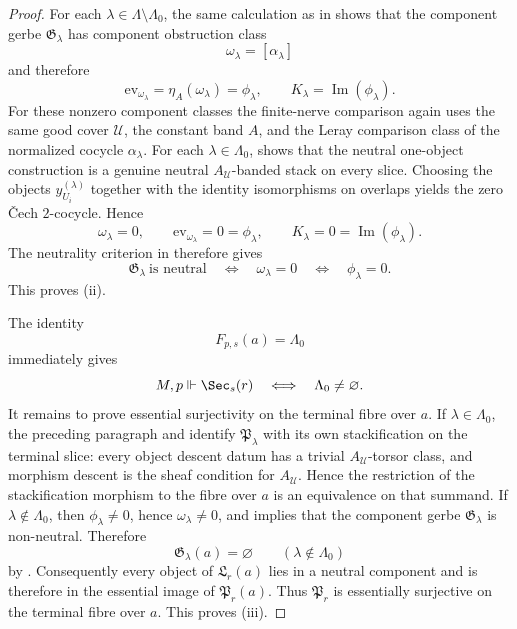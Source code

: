 \begin{proof}
For each $\lambda\in\Lambda\setminus\Lambda_0$, the same calculation as in  shows that the component gerbe $\mathfrak G_\lambda$ has component obstruction class
\[
\omega_\lambda=[\alpha_\lambda]
\]
and therefore
\[
\mathrm{ev}_{\omega_\lambda}=\eta_A(\omega_\lambda)=\phi_\lambda,
\qquad
K_\lambda=\operatorname{Im}(\phi_\lambda).
\]
For these nonzero component classes the finite-nerve comparison again uses the same good cover $\mathcal U$, the constant band $A$, and the Leray comparison class of the normalized cocycle $\alpha_\lambda$.
For each $\lambda\in\Lambda_0$, 
shows that the neutral one-object construction is a genuine neutral
\(A_{\mathcal U}\)-banded stack on every slice. Choosing the objects
$y_{U_i}^{(\lambda)}$ together with the identity isomorphisms on overlaps
yields the zero \v{C}ech $2$-cocycle. Hence
\[
\omega_\lambda=0,
\qquad
\mathrm{ev}_{\omega_\lambda}=0=\phi_\lambda,
\qquad
K_\lambda=0=\operatorname{Im}(\phi_\lambda).
\]
The neutrality criterion in  therefore gives
\[
\mathfrak G_\lambda\ \text{is neutral}
\quad\Longleftrightarrow\quad
\omega_\lambda=0
\quad\Longleftrightarrow\quad
\phi_\lambda=0.
\]
This proves \textup{(ii)}.

The identity
\[
F_{p,s}(a)=\Lambda_0
\]
immediately gives
\[
M,p\Vdash \Sec_s(r)
\quad\Longleftrightarrow\quad
\Lambda_0\neq\varnothing.
\]
It remains to prove essential surjectivity on the terminal fibre over $a$. If \(\lambda\in\Lambda_0\),
the preceding paragraph and  identify
\(\mathfrak P_\lambda\) with its own stackification on the terminal slice:
every object descent datum has a trivial \(A_{\mathcal U}\)-torsor class, and
morphism descent is the sheaf condition for \(A_{\mathcal U}\). Hence the
restriction of the stackification morphism to the fibre over \(a\) is an
equivalence on that summand. If $\lambda\notin\Lambda_0$, then
$\phi_\lambda\neq 0$, hence $\omega_\lambda\neq 0$, and
 implies that the component gerbe
$\mathfrak G_\lambda$ is non-neutral. Therefore
\[
\mathfrak G_\lambda(a)=\varnothing
\qquad
(\lambda\notin\Lambda_0)
\]
by . Consequently every object of $\mathfrak L_r(a)$ lies in a neutral component and is therefore in the essential image of $\mathfrak P_r(a)$. Thus $\mathfrak P_r$ is essentially surjective on the terminal fibre over $a$. This proves \textup{(iii)}.


\end{proof}
